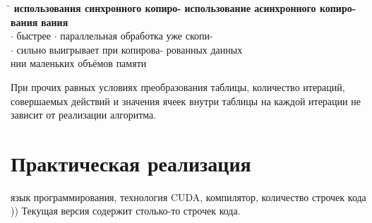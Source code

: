 \documentclass[a4paper,14pt,russian]{extreport}
\begin{document}
\begin{tabbing}
\hspace{0.5\textwidth} \= \hspace{0.5\textwidth} \kill
{\bf использования синхронного копиро-} \> {\bf использование асинхронного копиро-} \\
{\bf вания} \> {\bf вания} \\
$\cdot$ быстрее \> $\cdot$ параллельная обработка уже скопи- \\
$\cdot$ сильно выигрывает при копирова- \> рованных данных\\
нии маленьких объёмов памяти \>  
\end{tabbing}
\par
При прочих равных условиях преобразования таблицы, количество итераций, 
совершаемых действий и значения ячеек внутри таблицы на каждой итерации не зависит от реализации алгоритма. 

\chapter{Практическая реализация}  
язык программирования, технология CUDA, компилятор, количество строчек кода ))
Текущая версия содержит столько-то строчек кода. 
\end{document}
